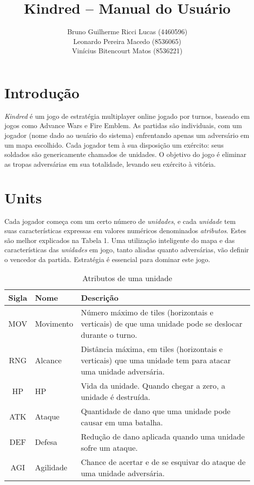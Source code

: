 \documentclass{article}
\title{
    Kindred -- Manual do Usuário
}
\author{
    Bruno Guilherme Ricci Lucas (4460596)\\
    Leonardo Pereira Macedo (8536065)\\
    Vinícius Bitencourt Matos (8536221)
}
\begin{document}
\maketitle

\section{Introdução}

\emph{Kindred} é um jogo de estratégia multiplayer online jogado por turnos, baseado em jogos como Advance Wars e Fire Emblem. As partidas são individuais, com um jogador (nome dado ao usuário do sistema) enfrentando apenas um adversário em um mapa escolhido. Cada jogador tem à sua disposição um exército: seus soldados são genericamente chamados de unidades. O objetivo do jogo é eliminar as tropas adversárias em sua totalidade, levando seu exército à vitória.

\section{Units}
Cada jogador começa com um certo número de \emph{unidades}, e cada \emph{unidade} tem suas características expressas em valores numéricos denominados \emph{atributos}. Estes são melhor explicados na Tabela 1. Uma utilização inteligente do mapa e das características das \emph{unidades} em jogo, tanto aliadas quanto adversárias, vão definir o vencedor da partida. Estratégia é essencial para dominar este jogo.

\begin{table}[H]
\centering
\begin{tabular}{|c|l|p{}|}\hline
 \textbf{Sigla} & \textbf{Nome} & \textbf{Descrição} \\\hline
 MOV & Movimento & Número máximo de tiles (horizontais e verticais) de que uma unidade pode se deslocar durante o turno. \\\hline
 RNG & Alcance   & Distância máxima, em tiles (horizontais e verticais) que uma unidade tem para atacar uma unidade adversária. \\\hline
 HP  & HP        & Vida da unidade. Quando chegar a zero, a unidade é destruída. \\\hline
 ATK & Ataque    & Quantidade de dano que uma unidade pode causar em uma batalha. \\\hline
 DEF & Defesa    & Redução de dano aplicada quando uma unidade sofre um ataque. \\\hline
 AGI & Agilidade & Chance de acertar e de se esquivar do ataque de uma unidade adversária. \\\hline
\end{tabular}
\caption{Atributos de uma unidade}
\end{table}
\end{document}

